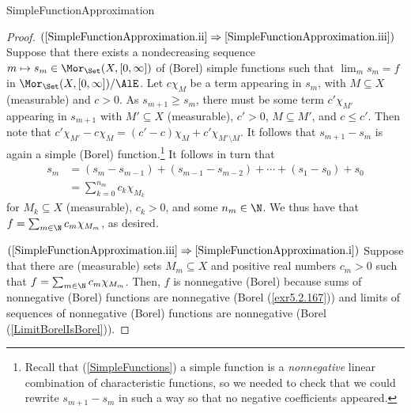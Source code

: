 \begin{prp}{}{SimpleFunctionApproximation}
\begin{proof}
\blankline
\noindent
$(\cref{SimpleFunctionApproximation.ii}\Rightarrow \cref{SimpleFunctionApproximation.iii})$ Suppose that there exists a nondecreasing sequence $m\mapsto s_m\in \Mor _{\Set}(X,[0,\infty ])$ of (Borel) simple functions such that $\lim _ms_m=f$ in $\Mor _{\Set}(X,[0,\infty ])/\AlE$.  Let $c\chi _M$ be a term appearing in $s_m$, with $M\subseteq X$ (measurable) and $c>0$.  As $s_{m+1}\geq s_m$, there must be some term $c'\chi _{M'}$ appearing in $s_{m+1}$ with $M'\subseteq X$ (measurable), $c'>0$, $M\subseteq M'$, and $c\leq c'$.  Then note that $c'\chi _{M'}-c\chi _M=(c'-c)\chi _M+c'\chi _{M'\setminus M}$.  It follows that $s_{m+1}-s_m$ is again a simple (Borel) function.\footnote{Recall that (\cref{SimpleFunctions}) a simple function is a \emph{nonnegative} linear combination of characteristic functions, so we needed to check that we could rewrite $s_{m+1}-s_m$ in such a way so that no negative coefficients appeared.}  It follows in turn that
\begin{equation*}
\begin{split}
s_m & =(s_m-s_{m-1})+(s_{m-1}-s_{m-2})+\cdots +(s_1-s_0)+s_0 \\
& =\sum _{k=0}^{n_m}c_k\chi _{M_k}
\end{split}
\end{equation*}
for $M_k\subseteq X$ (measurable), $c_k>0$, and some $n_m\in \N$.  We thus have that $f=\sum _{m\in \N}c_m\chi _{M_m}$, as desired.

\blankline
\noindent
$(\cref{SimpleFunctionApproximation.iii}\Rightarrow \cref{SimpleFunctionApproximation.i})$ Suppose that there are (measurable) sets $M_m\subseteq X$ and positive real numbers $c_m>0$ such that $f=\sum _{m\in \N}c_m\chi _{M_m}$.  Then, $f$ is nonnegative (Borel) because sums of nonnegative (Borel) functions are nonnegative (Borel (\cref{exr5.2.167})) and limits of sequences of nonnegative (Borel) functions are nonnegative (Borel (\cref{LimitBorelIsBorel})).
\end{proof}
\end{prp}

